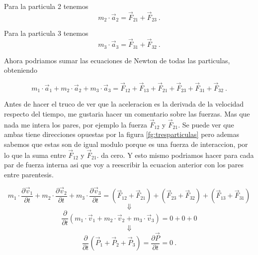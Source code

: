 \documentclass[../Main.tex]{subfiles}
\begin{document}
\begin{minipage}[t]{0.6\textwidth}

Para la particula 2 tenemos
\begin{equation*}
    m_2 \cdot \vec{a} _2 = \vec{F} _{21} + \vec{F} _{23} \ .
\end{equation*}

Para la particula 3 tenemos
\begin{equation*}
    m_3 \cdot \vec{a} _3 = \vec{F} _{31} + \vec{F} _{32} \ .
\end{equation*}

Ahora podriamos sumar las ecuaciones de Newton de todas las particulas,
obteniendo

\begin{equation*}
     m_1 \cdot \vec{a} _1 + m_2 \cdot \vec{a} _2 + m_3 \cdot \vec{a} _3 = \vec{F} _{12} + \vec{F} _{13} + \vec{F} _{21} + \vec{F} _{23} + \vec{F} _{31} + \vec{F} _{32} \ .
\end{equation*}

Antes de hacer el truco de ver que la aceleracion es la derivada de la
velocidad respecto del tiempo, me gustaria hacer un comentario sobre las
fuerzas. Mas que nada me intera los pares, por ejemplo la fuerza $\vec{F} _{12}$
y $\vec{F} _{21} $. Se puede ver que ambas tiene direcciones opuestas por la
figura \ref{fg:tresparticulas} pero ademas sabemos que estas son de igual modulo porque es una
fuerza de interaccion, por lo que la suma entre $\vec{F} _{12}$ y $\vec{F} _{21}$.
da cero. Y esto mismo podriamos hacer para cada par de fuerza interna asi que
voy a reescribir la ecuacion anterior con los pares entre parentesis.

\begin{equation*}
     m_1 \cdot \frac{\partial \vec{v} _1}{\partial t} + m_2 \cdot \frac{\partial \vec{v} _2}{\partial t} + m_3 \cdot \frac{\partial \vec{v} _3}{\partial t} = (\vec{F} _{12} + \vec{F} _{21}) + (\vec{F} _{23} + \vec{F} _{32}) + (\vec{F} _{13} + \vec{F} _{31})
\end{equation*}
\begin{equation*}
    \Downarrow
\end{equation*}
\begin{equation*}
   \frac{\partial}{\partial t} \left(m_1 \cdot \vec{v} _1 + m_2 \cdot \vec{v} _2 + m_3 \cdot \vec{v} _3 \right) =  0 + 0 + 0
\end{equation*}
\begin{equation*}
    \Downarrow
\end{equation*}
\begin{equation}
    \frac{\partial}{\partial t} \left(\vec{P} _1 + \vec{P} _2 + \vec{P} _3 \right) = \frac{\partial \vec{P}}{\partial t} = 0 \ .
\end{equation}


\end{minipage}
\end{document}
